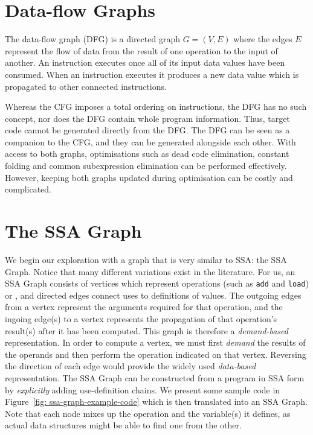 \section{Data-flow Graphs}

The data-flow graph (DFG) is a directed graph $G=(V,E)$ where the edges $E$ represent the flow of data from the result of one operation to the input of another. An instruction executes once all of its input data values have been consumed. When an instruction executes it produces a new data value which is propagated to other connected instructions. 

Whereas the CFG imposes a total ordering on instructions, the DFG has no such concept, nor does the DFG contain whole program information. Thus, target code cannot be generated directly from the DFG. The DFG can be seen as a companion to the CFG, and they can be generated alongside each other. With access to both graphs, optimisations such as dead code elimination, constant folding and common subexpression elimination can be performed effectively. However, keeping both graphs updated during optimisation can be costly and complicated.

\section{The SSA Graph}

We begin our exploration with a graph that is very similar to SSA: the SSA Graph. Notice that many different variations exist in the literature. For us, an SSA Graph consists of vertices which represent operations (such as \texttt{add} and \texttt{load}) or \phifuns, and directed edges connect uses to definitions of values. The outgoing edges from a vertex represent the arguments required for that operation, and the ingoing edge(s) to a vertex represents the propagation of that operation's result(s) after it has been computed. This graph is therefore a \textit{demand-based} representation. In order to compute a vertex, we must first \textit{demand} the results of the operands and then perform the operation indicated on that vertex. Reversing the direction of each edge would provide the widely used \emph{data-based} representation. The SSA Graph can be constructed from a program in SSA form by \textit{explicitly} adding use-definition chains. We present some sample code in Figure~\ref{fig: ssa-graph-example-code} which is then translated into an SSA Graph. 
Note that each node mixes up the operation and the variable(s) it defines, as actual data structures might be able to find one from the other. 

